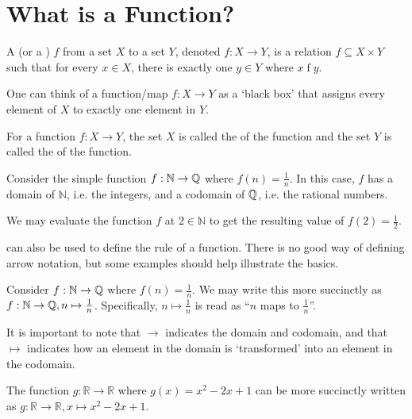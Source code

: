 \section{What is a Function?}
\begin{definition}
    A  (or a ) $f$ from a set $X$ to a set $Y$, denoted $f: X \to Y$,  is a relation $f \subseteq X \times Y$ such that for every $x \in X$, there is exactly one $y \in Y$ where $x\mathrel{f}y$.
\end{definition}
\begin{remark}
    One can think of a function/map $f:X\to Y$ as a `black box' that assigns every element of $X$ to exactly one element in $Y$.
\end{remark}

\begin{definition}
    For a function $f: X \to Y$, the set $X$ is called the  of the function and the set $Y$ is called the  of the function.
\end{definition}

\begin{example}
    Consider the simple function $f: \mathbb{N} \to \mathbb{Q}$ where $f(n) = \frac1n$. In this case, $f$ has a domain of $\mathbb{N}$, i.e. the integers, and a codomain of $\mathbb{Q}$, i.e. the rational numbers.

    We may evaluate the function $f$ at $2 \in \mathbb{N}$ to get the resulting value of $f(2) = \frac12$.
\end{example}

 can also be used to define the rule of a function. There is no good way of defining arrow notation, but some examples should help illustrate the basics.

\begin{example}
    Consider $f: \mathbb{N} \to \mathbb{Q}$ where $f(n) = \frac1n$. We may write this more succinctly as $f: \mathbb{N} \to \mathbb{Q}, n \mapsto \frac1n$. Specifically, $n \mapsto \frac1n$ is read as ``$n$ maps to $\frac1n$''.

    It is important to note that $\to$ indicates the domain and codomain, and that $\mapsto$ indicates how an element in the domain is `transformed' into an element in the codomain.
\end{example}

\begin{example}
    The function $g: \mathbb{R} \to \mathbb{R}$ where $g(x) = x^2 - 2x + 1$ can be more succinctly written as $g: \mathbb{R} \to \mathbb{R}, x \mapsto x^2 - 2x + 1$.
\end{example}

